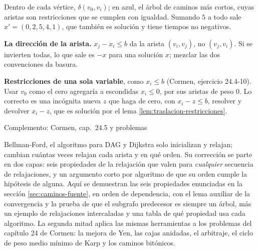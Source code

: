 \documentclass[11pt,letterpaper]{article}
\begin{document}
\begin{ejemplo}
\begin{center}
  \end{center}
  Dentro de cada vértice, $\delta(v_0, v_i)$; en azul, el árbol de
  caminos más cortos, cuyas aristas son restricciones que se cumplen
  con igualdad. Sumando $5$ a todo sale $x' = (0, 2, 5, 4, 1)$, que
  también es solución y tiene tiempos no negativos.
\end{ejemplo}

\begin{ojo}
  \textbf{La dirección de la arista.} $x_j - x_i \le b$ da la arista
  $(v_i, v_j)$, no $(v_j, v_i)$. Si se invierten todas, lo que sale es
  $-x$ para una solución $x$; mezclar las dos convenciones da basura.

  \smallskip
  \textbf{Restricciones de una sola variable}, como $x_i \le b$
  (Cormen, ejercicio 24.4-10). Usar $v_0$ como el cero agregaría a
  escondidas $x_i \le 0$, por sus aristas de peso $0$. Lo correcto es
  una incógnita nueva $z$ que haga de cero, con $x_i - z \le b$,
  resolver y devolver $x_i - z$, que es solución por el lema
  \ref{lem:traslacion-restricciones}.
\end{ojo}

\newpage


%
  {Complemento: Cormen, cap.\ 24.5 y problemas}
\label{sec:caminos-pruebas}

\begin{quick_sum}
  Bellman-Ford, el algoritmo para DAG y Dijkstra solo inicializan y
  relajan; cambian cuántas veces relajan cada arista y en qué orden.
  Su corrección se parte en dos capas: seis propiedades de la
  relajación que valen para \emph{cualquier} secuencia de
  relajaciones, y un argumento corto por algoritmo de que su orden
  cumple la hipótesis de alguna. Aquí se demuestran las seis
  propiedades enunciadas en la sección \ref{sec:caminos-fuente}, en
  orden de dependencia, con el lema auxiliar de la convergencia y la
  prueba de que el subgrafo predecesor es siempre un árbol, más un
  ejemplo de relajaciones intercaladas y una tabla de qué propiedad
  usa cada algoritmo. La segunda mitad aplica las mismas herramientas
  a los problemas del capítulo 24 de Cormen: la mejora de Yen, las
  cajas anidadas, el arbitraje, el ciclo de peso medio mínimo de Karp
  y los caminos bitónicos.
\end{quick_sum}
\end{document}
